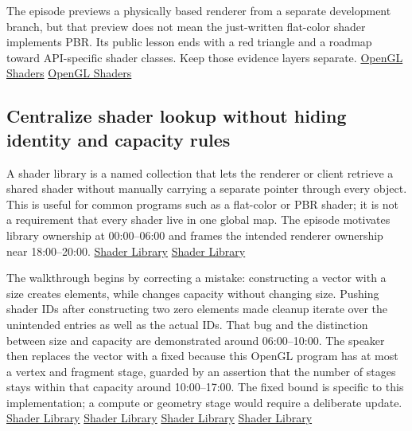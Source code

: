 The episode previews a physically based renderer from a separate development branch, but that preview does not mean the just-written flat-color shader implements PBR. Its public lesson ends with a red triangle and a roadmap toward API-specific shader classes. Keep those evidence layers separate. \href{https://www.youtube.com/watch?v=QBCCHm_9HV8&t=0s}{OpenGL Shaders} \href{https://www.youtube.com/watch?v=QBCCHm_9HV8&t=2460s}{OpenGL Shaders}

\subsection{Centralize shader lookup without hiding identity and capacity rules}\label{06-engine-ii-ch025-centralize-shader-lookup-without-hiding-identity-and-capacity-rules}

\hypertarget{06-engine-ii-ch025-centralize-shader-lookup-without-hiding-identity-and-capacity-rules}{}

A shader library is a named collection that lets the renderer or client retrieve a shared shader without manually carrying a separate pointer through every object. This is useful for common programs such as a flat-color or PBR shader; it is not a requirement that every shader live in one global map. The episode motivates library ownership at 00:00--06:00 and frames the intended renderer ownership near 18:00--20:00. \href{https://www.youtube.com/watch?v=Z9LE3ksHEQQ&t=0s}{Shader Library} \href{https://www.youtube.com/watch?v=Z9LE3ksHEQQ&t=1080s}{Shader Library}

The walkthrough begins by correcting a  mistake: constructing a vector with a size creates elements, while  changes capacity without changing size. Pushing shader IDs after constructing two zero elements made cleanup iterate over the unintended entries as well as the actual IDs. That bug and the distinction between size and capacity are demonstrated around 06:00--10:00. The speaker then replaces the vector with a fixed  because this OpenGL program has at most a vertex and fragment stage, guarded by an assertion that the number of stages stays within that capacity around 10:00--17:00. The fixed bound is specific to this implementation; a compute or geometry stage would require a deliberate update. \href{https://www.youtube.com/watch?v=Z9LE3ksHEQQ&t=360s}{Shader Library} \href{https://www.youtube.com/watch?v=Z9LE3ksHEQQ&t=540s}{Shader Library} \href{https://www.youtube.com/watch?v=Z9LE3ksHEQQ&t=660s}{Shader Library} \href{https://www.youtube.com/watch?v=Z9LE3ksHEQQ&t=900s}{Shader Library}

